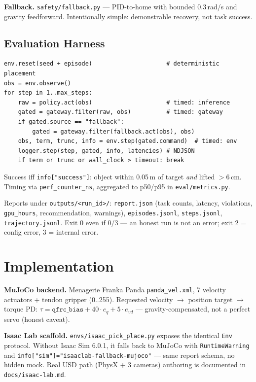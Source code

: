 \documentclass[11pt,a4paper,twocolumn]{article}
\begin{document}
\textbf{Fallback.} \texttt{safety/fallback.py} --- PID-to-home with bounded 0.3\,rad/s and gravity feedforward. Intentionally simple: demonstrable recovery, not task success.

\subsection{Evaluation Harness}

\begin{lstlisting}[style=code, caption={Per-episode loop}]
env.reset(seed + episode)                     # deterministic placement
obs = env.observe()
for step in 1..max_steps:
    raw = policy.act(obs)                     # timed: inference
    gated = gateway.filter(raw, obs)          # timed: gateway
    if gated.source == "fallback":
        gated = gateway.filter(fallback.act(obs), obs)
    obs, term, trunc, info = env.step(gated.command)  # timed: env
    logger.step(step, gated, info, latencies) # NDJSON
    if term or trunc or wall_clock > timeout: break
\end{lstlisting}

Success iff \texttt{info["success"]}: object within 0.05\,m of target \textit{and} lifted $>$6\,cm. Timing via \texttt{perf\_counter\_ns}, aggregated to p50/p95 in \texttt{eval/metrics.py}.

Reports under \texttt{outputs/<run\_id>/}: \texttt{report.json} (task counts, latency, violations, \texttt{gpu\_hours}, recommendation, warnings), \texttt{episodes.jsonl}, \texttt{steps.jsonl}, \texttt{trajectory.jsonl}. Exit 0 even if 0/3 --- an honest run is not an error; exit 2 = config error, 3 = internal error.

\section{Implementation}

\textbf{MuJoCo backend.} Menagerie Franka Panda \texttt{panda\_vel.xml}, 7 velocity actuators + tendon gripper (0..255). Requested velocity $\rightarrow$ position target $\rightarrow$ torque PD: $\tau = \texttt{qfrc\_bias} + 40\cdot e_q + 5\cdot e_{vd}$ --- gravity-compensated, not a perfect servo (honest caveat).

\textbf{Isaac Lab scaffold.} \texttt{envs/isaac\_pick\_place.py} exposes the identical \texttt{Env} protocol. Without Isaac Sim 6.0.1, it falls back to MuJoCo with \texttt{RuntimeWarning} and \texttt{info["sim"]="isaaclab-fallback-mujoco"} --- same report schema, no hidden mock. Real USD path (PhysX + 3 cameras) authoring is documented in \texttt{docs/isaac-lab.md}.
\end{document}
